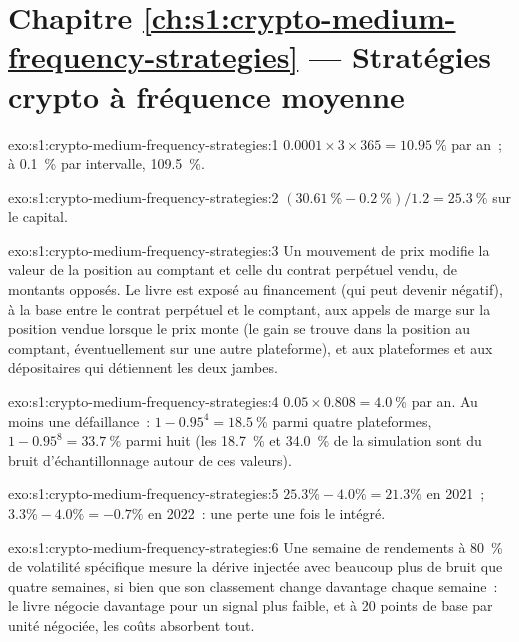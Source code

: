 \section*{Chapitre \ref{ch:s1:crypto-medium-frequency-strategies} --- Stratégies crypto à fréquence moyenne}

\begin{solution}{exo:s1:crypto-medium-frequency-strategies:1}
$0.0001 \times 3 \times 365 = 10.95~\%$ par an~; à 0.1~\% par intervalle, 109.5~\%.
\end{solution}

\begin{solution}{exo:s1:crypto-medium-frequency-strategies:2}
$(30.61~\% - 0.2~\%)/1.2 = 25.3~\%$ sur le capital.
\end{solution}

\begin{solution}{exo:s1:crypto-medium-frequency-strategies:3}
Un mouvement de prix modifie la valeur de la position au comptant et celle du contrat perpétuel vendu, de montants opposés. Le livre est exposé au financement (qui peut devenir négatif),
à la base entre le contrat perpétuel et le comptant, aux appels de marge sur la position vendue lorsque le prix monte (le gain se trouve dans la position au comptant, éventuellement sur une autre plateforme), et
aux plateformes et aux dépositaires qui détiennent les deux jambes.
\end{solution}

\begin{solution}{exo:s1:crypto-medium-frequency-strategies:4}
$0.05 \times 0.808 = 4.0~\%$ par an. Au moins une défaillance~: $1 - 0.95^4 = 18.5~\%$ parmi quatre plateformes, $1 - 0.95^8 = 33.7~\%$ parmi huit (les
18.7~\% et 34.0~\% de la simulation sont du bruit d'échantillonnage autour de ces valeurs).
\end{solution}

\begin{solution}{exo:s1:crypto-medium-frequency-strategies:5}
$25.3\% - 4.0\% = 21.3\%$ en 2021~; $3.3\% - 4.0\% = -0.7\%$ en 2022~: une perte une fois le  intégré.
\end{solution}

\begin{solution}{exo:s1:crypto-medium-frequency-strategies:6}
Une semaine de rendements à 80~\% de volatilité spécifique mesure la dérive injectée avec beaucoup plus de bruit que quatre semaines, si bien que son classement change davantage chaque semaine~:
le livre négocie davantage pour un signal plus faible, et à 20 points de base par unité négociée, les coûts absorbent tout.
\end{solution}

